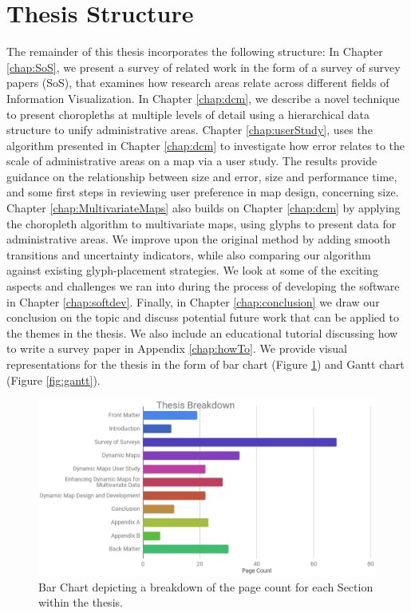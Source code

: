 \section{Thesis Structure}
The remainder of this thesis incorporates the following structure: In Chapter \ref{chap:SoS}, we present a survey of related work in the form of a survey of survey papers (SoS), that examines how research areas relate across different fields of Information Visualization. In Chapter \ref{chap:dcm}, we describe a novel technique to present choropleths at multiple levels of detail using a hierarchical data structure to unify administrative areas. Chapter \ref{chap:userStudy}, uses the algorithm presented in Chapter \ref{chap:dcm} to investigate how error relates to the scale of administrative areas on a map via a user study. The results provide guidance on the relationship between size and error, size and performance time, and some first steps in reviewing user preference in map design, concerning size. Chapter \ref{chap:MultivariateMaps} also builds on Chapter \ref{chap:dcm} by applying the choropleth algorithm to multivariate maps, using glyphs to present data for administrative areas. We improve upon the original method by adding smooth transitions and uncertainty indicators, while also comparing our algorithm against existing glyph-placement strategies. We look at some of the exciting aspects and challenges we ran into during the process of developing the software in Chapter \ref{chap:softdev}. Finally, in Chapter \ref{chap:conclusion} we draw our conclusion on the topic and discuss potential future work that can be applied to the themes in the thesis. We also include an educational tutorial discussing how to write a survey paper in Appendix \ref{chap:howTo}. We provide visual representations for the thesis in the form of bar chart (Figure \ref{fig:pages}) and Gantt chart (Figure \ref{fig:gantt}). 

\begin{figure}
\includegraphics[width=1\textwidth]{images/ch1/thesisbreakdown.png}
\caption{Bar Chart depicting a breakdown of the page count for each Section within the thesis.} \label{fig:pages}
\end{figure}

